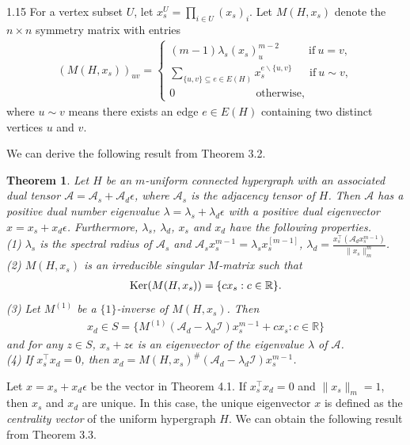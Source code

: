 \documentclass[preprint,12pt]{elsarticle}
\newtheorem{thm}{Theorem}[section]
\begin{document}
\begin{spacing}{1.15}
For a vertex subset $U$, let $x_s^U=\prod_{i\in U}(x_s)_i$. Let $M(H,x_s)$ denote the $n\times n$ symmetry matrix with entries
\begin{eqnarray*}
(M(H,x_s))_{uv}=\begin{cases}(m-1)\lambda_s(x_s)_u^{m-2}~~~~~~~~~~~~\mbox{if}~u=v,\\
\sum_{\{u,v\}\subseteq e\in E(H)}x_s^{e\backslash\{u,v\}}~~~~~~~\mbox{if}~u\sim v,\\
0~~~~~~~~~~~~~~~~~~~~~~~~~~~~~~~~~\mbox{otherwise},\end{cases}
\end{eqnarray*}
where $u\sim v$ means there exists an edge $e\in E(H)$ containing two distinct vertices $u$ and $v$.

We can derive the following result from Theorem 3.2.
\begin{thm}
Let $H$ be an $m$-uniform connected hypergraph with an associated dual tensor $\mathcal{A}=\mathcal{A}_s+\mathcal{A}_d\epsilon$, where $\mathcal{A}_s$ is the adjacency tensor of $H$. Then $\mathcal{A}$ has a positive dual number eigenvalue $\lambda=\lambda_s+\lambda_d\epsilon$ with a positive dual eigenvector $x=x_s+x_d\epsilon$. Furthermore, $\lambda_s$, $\lambda_d$, $x_s$ and $x_d$ have the following properties.\\
(1) $\lambda_s$ is the spectral radius of $\mathcal{A}_s$ and $\mathcal{A}_sx_s^{m-1}=\lambda_sx_s^{[m-1]}$, $\lambda_d=\frac{x_s^\top(\mathcal{A}_dx_s^{m-1})}{\|x_s\|_m^m}$.\\
(2) $M(H,x_s)$ is an irreducible singular $M$-matrix such that
\begin{eqnarray*}
{\rm Ker}(M(H,x_s))=\{cx_s:c\in\mathbb{R}\}.
\end{eqnarray*}
(3) Let $M^{(1)}$ be a $\{1\}$-inverse of $M(H,x_s)$. Then
\begin{eqnarray*}
x_d\in S=\{M^{(1)}(\mathcal{A}_d-\lambda_d\mathcal{I})x_s^{m-1}+cx_s:c\in\mathbb{R}\}
\end{eqnarray*}
and for any $z\in S$, $x_s+z\epsilon$ is an eigenvector of the eigenvalue $\lambda$ of $\mathcal{A}$.\\
(4) If $x_s^\top x_d=0$, then $x_d=M(H,x_s)^\#(\mathcal{A}_d-\lambda_d\mathcal{I})x_s^{m-1}$.
\end{thm}
Let $x=x_s+x_d\epsilon$ be the vector in Theorem 4.1. If $x_s^\top x_d=0$ and $\|x_s\|_m=1$, then $x_s$ and $x_d$ are unique. In this case, the unique eigenvector $x$ is defined as the \textit{centrality vector} of the uniform hypergraph $H$. We can obtain the following result from Theorem 3.3.

\end{spacing}
\end{document}
